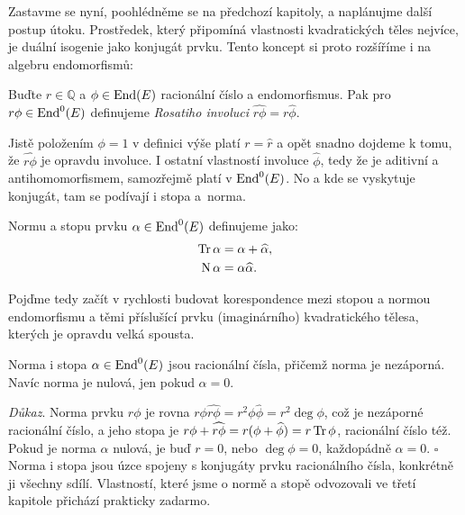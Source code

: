 \documentclass[12pt]{report}
\begin{document}
Zastavme se nyní, poohlédněme se na předchozí kapitoly, a naplánujme další postup útoku. Prostředek, který připomíná vlastnosti kvadratických těles nejvíce, je duální isogenie jako konjugát prvku. Tento koncept si proto rozšíříme i na algebru endomorfismů:
\begin{definice}
Buďte $r \in \mathbb{Q}$ a $\phi \in \operatorname{End}(E)$ racionální číslo a endomorfismus. Pak pro $r \phi \in \operatorname{End}^0 (E)$ definujeme \textit{Rosatiho involuci} $\widehat{r \phi} = r \widehat{\phi}$.
\end{definice}
Jistě položením $\phi = 1$ v definici výše platí $r = \widehat{r}$ a opět snadno dojdeme k tomu, že $\widehat{r \phi}$ je opravdu involuce. I ostatní vlastností involuce $\widehat{\phi}$, tedy že je aditivní a antihomomorfismem, samozřejmě platí v $\operatorname{End}^0 (E)$. No a kde se vyskytuje konjugát, tam se podívají i stopa a~norma.
\begin{definice}
Normu a stopu prvku $\alpha \in \operatorname{End}^0(E)$ definujeme jako:
\begin{align*}
\operatorname{Tr} \alpha &= \alpha+\widehat{\alpha},\\
\operatorname{N} \alpha &= \alpha \widehat{\alpha}. 
\end{align*}
\end{definice}

Pojďme tedy začít v rychlosti budovat korespondence mezi stopou a normou endomorfismu a těmi příslušící prvku (imaginárního) kvadratického tělesa, kterých je opravdu velká spousta.

\begin{veta}
Norma i stopa $\alpha \in \operatorname{End}^0 (E)$ jsou racionální čísla, přičemž norma je nezáporná. Navíc norma je nulová, jen pokud $\alpha = 0$.
\end{veta}
\noindent \textit{Důkaz}. Norma prvku $r \phi$ je rovna $r \phi \widehat{r \phi} = r^2 \phi \widehat{\phi} = r^2 \deg \phi$, což je nezáporné racionální číslo, a jeho stopa je $r \phi + \widehat{r \phi} = r (\phi+\widehat{\phi}) = r \operatorname{Tr} \phi$, racionální číslo též. Pokud je norma $\alpha$ nulová, je buď $r=0$, nebo $\deg \phi = 0$, každopádně $\alpha = 0$. \hfill $\square$\\

Norma i stopa jsou úzce spojeny s konjugáty prvku racionálního čísla, konkrétně ji všechny sdílí. Vlastností, které jsme o normě a stopě odvozovali ve třetí kapitole přichází prakticky zadarmo.
\end{document}

